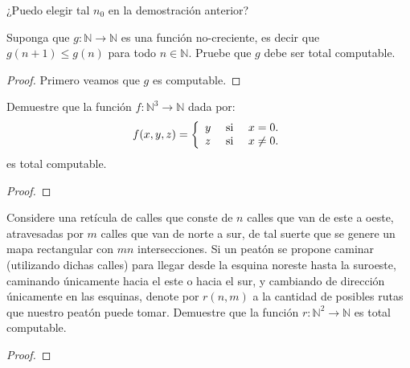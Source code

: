 \documentclass[12pt]{report}
\theoremstyle{largebreak}
\newcommand\cf[3]{\ensuremath{#1:#2\rightarrow#3}}
\begin{document}
    \begin{obs}
        ¿Puedo elegir tal $n_0$ en la demostración anterior?
    \end{obs}

    \begin{excer}
        Suponga que $\cf{g}{\mathbb{N}}{\mathbb{N}}$ es una función no-creciente, es decir que $g(n+1)\leq g(n)$ para todo $n\in\mathbb{N}$. Pruebe que $g$ debe ser total computable.
    \end{excer}

    \begin{proof}
        Primero veamos que $g$ es computable.
    \end{proof}

    \begin{excer}
        Demuestre que la función $\cf{f}{\mathbb{N}^3}{\mathbb{N}}$ dada por:
        \begin{equation*}
            f(x,y,z)=\left\{
                \begin{array}{lcr}
                    y & \textup{ si } & x=0.\\
                    z & \textup{ si } & x\neq0.\\
                \end{array}
            \right.
        \end{equation*}
        es total computable.
    \end{excer}

    \begin{proof}
        
    \end{proof}

    \begin{excer}
        Considere una retícula de calles que conste de $n$ calles que van de este a oeste, atravesadas por $m$ calles que van de norte a sur, de tal suerte que se genere un mapa rectangular con $mn$ intersecciones. Si un peatón se propone caminar (utilizando dichas calles) para llegar desde la esquina noreste hasta la suroeste, caminando únicamente hacia el este o hacia el sur, y cambiando de dirección únicamente en las esquinas, denote por $r(n,m)$ a la cantidad de posibles rutas que nuestro peatón puede tomar. Demuestre que la función $\cf{r}{\mathbb{N}^2}{\mathbb{N}}$ es total computable.
    \end{excer}

    \begin{proof}
        
    \end{proof}
\end{document}
